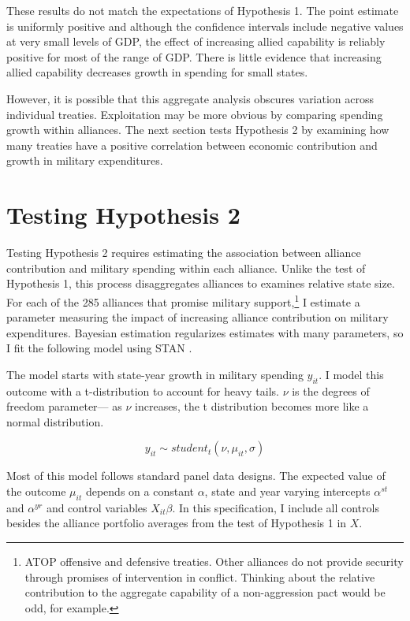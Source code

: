 \documentclass[12pt]{article}
\begin{document}
These results do not match the expectations of Hypothesis 1. 
The point estimate is uniformly positive and although the confidence intervals include negative values at very small levels of GDP, the effect of increasing allied capability is reliably positive for most of the range of GDP. 
There is little evidence that increasing allied capability decreases growth in spending for small states. 


However, it is possible that this aggregate analysis obscures variation across individual treaties. 
Exploitation may be more obvious by comparing spending growth within alliances. 
The next section tests Hypothesis 2 by examining how many treaties have a positive correlation between economic contribution and growth in military expenditures. 


\section{Testing Hypothesis 2}


Testing Hypothesis 2 requires estimating the association between alliance contribution and military spending within each alliance.
Unlike the test of Hypothesis 1, this process disaggregates alliances to examines relative state size. 
For each of the 285 alliances that promise military support,\footnote{ATOP offensive and defensive treaties. Other alliances do not provide security through promises of intervention in conflict. Thinking about the relative contribution to the aggregate capability of a non-aggression pact would be odd, for example.} 
I estimate a parameter measuring the impact of increasing alliance contribution on military expenditures. 
Bayesian estimation regularizes estimates with many parameters, so I fit the following model using STAN \citep{Carpenteretal2016}.


The model starts with state-year growth in military spending $y_{it}$.
I model this outcome with a t-distribution to account for heavy tails.
$\nu$ is the degrees of freedom parameter--- as $\nu$ increases, the t distribution becomes more like a normal distribution. 


\begin{equation}
y_{it} \sim student_t(\nu, \mu_{it}, \sigma) 
\end{equation}


Most of this model follows standard panel data designs.
The expected value of the outcome $\mu_{it}$ depends on a constant $\alpha$, state and year varying intercepts $\alpha^{st}$ and $\alpha^{yr}$ and control variables $X_{it} \beta$. 
In this specification, I include all controls besides the alliance portfolio averages from the test of Hypothesis 1 in $X$.
\end{document}
